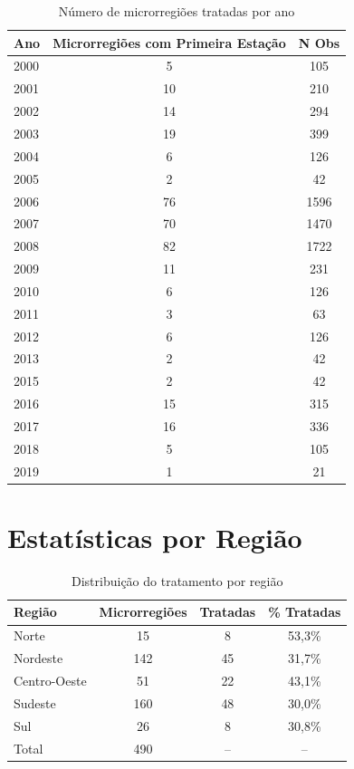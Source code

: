 \documentclass[
	12pt,				%
	oneside,			%
	a4paper,			%
	english,			%
	french,				%
	spanish,			%
	brazil				%
	]{abntex2}
\begin{document}
\begin{apendicesenv}
\begin{table}[h]
\centering
\caption{Número de microrregiões tratadas por ano}
\label{tab:tratamento_temporal}
\begin{tabular}{lcc}
\toprule
Ano & Microrregiões com Primeira Estação & N Obs \\
\midrule
2000 & 5 & 105 \\
2001 & 10 & 210 \\
2002 & 14 & 294 \\
2003 & 19 & 399 \\
2004 & 6 & 126 \\
2005 & 2 & 42 \\
2006 & 76 & 1596 \\
2007 & 70 & 1470 \\
2008 & 82 & 1722 \\
2009 & 11 & 231 \\
2010 & 6 & 126 \\
2011 & 3 & 63 \\
2012 & 6 & 126 \\
2013 & 2 & 42 \\
2015 & 2 & 42 \\
2016 & 15 & 315 \\
2017 & 16 & 336 \\
2018 & 5 & 105 \\
2019 & 1 & 21 \\
\bottomrule
\end{tabular}
\end{table}

\section{Estatísticas por Região}

\begin{table}[h]
\centering
\caption{Distribuição do tratamento por região}
\label{tab:tratamento_regional}
\begin{tabular}{lccc}
\toprule
Região & Microrregiões & Tratadas & \% Tratadas \\
\midrule
Norte & 15 & 8 & 53,3\% \\
Nordeste & 142 & 45 & 31,7\% \\
Centro-Oeste & 51 & 22 & 43,1\% \\
Sudeste & 160 & 48 & 30,0\% \\
Sul & 26 & 8 & 30,8\% \\
\midrule
Total & 490 & -- & -- \\
\bottomrule
\end{tabular}
\end{table}


\end{apendicesenv}
\end{document}
